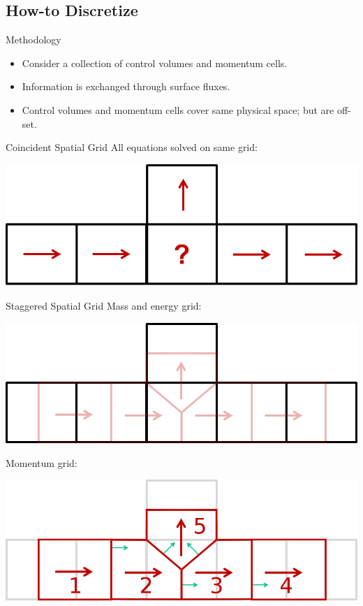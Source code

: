 \documentclass[10pt,t,xcolor=table,compress]{UWMadBeamer}
\newenvironment{Itemize}
    {\begin{itemize}\setlength{\itemsep}{0.8em}\setlength{\leftmargin}{0.0em}\setlength{\labelwidth}{0em}}
    {\end{itemize}}
\begin{document}
    \subsection*{How-to Discretize}
    \begin{frame}{Methodology}
        \begin{Itemize}
        \item{Consider a collection of control volumes and momentum cells.}
        \item{Information is exchanged through surface fluxes.}
        \item{Control volumes and momentum cells cover same physical space; but are off-set.}
        \end{Itemize}
    \end{frame}
    \begin{frame}{Coincident Spatial Grid}
        All equations solved on same grid:
        \begin{center}
            \includegraphics[scale=0.50]{BranchingProblem}
        \end{center}
    \end{frame}
    \begin{frame}{Staggered Spatial Grid}
        Mass and energy grid:\\
        \begin{center}
            \includegraphics[scale=0.40]{Staggered_Control}
        \end{center}
        Momentum grid:\\
        \begin{center}
            \includegraphics[scale=0.40]{Staggered_Momentum-NumberedWNormals}
        \end{center}
    \end{frame}
 
\end{document}
